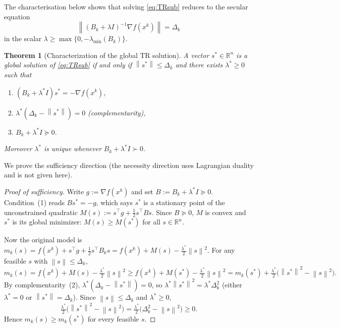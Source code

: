 \documentclass[11pt,a4paper]{report}
\theoremstyle{plain}
\newtheorem{theorem}{Theorem}[chapter]
\theoremstyle{definition}
\newcommand{\R}{\mathbb{R}}
\newcommand{\norm}[1]{\left\lVert#1\right\rVert}
\newcommand{\grad}{\nabla}
\newcommand{\trans}{^{\top}}
\begin{document}
The characterisation below shows that solving \eqref{eq:TRsub} reduces to the secular equation 
\[
  \norm{(B_{k}+\lambda I)^{-1}\grad f(x^{k})}=\Delta_{k}
\]
in the scalar $\lambda\ge\max\{0,-\lambda_{\min}(B_{k})\}$.

\begin{theorem}[Characterization of the global TR solution]\label{thm:TR-charac}
A vector $s^{*}\in\R^{n}$ is a global solution of \eqref{eq:TRsub} if and only if
$\norm{s^{*}}\le\Delta_{k}$ and there exists $\lambda^{*}\ge 0$ such that
\begin{enumerate}[leftmargin=2em,itemsep=0pt]
  \item $(B_{k}+\lambda^{*}I)s^{*}=-\grad f(x^{k})$,
  \item $\lambda^{*}(\Delta_{k}-\norm{s^{*}})=0$ \quad(complementarity),
  \item $B_{k}+\lambda^{*}I\succeq 0$.
\end{enumerate}
Moreover $\lambda^{*}$ is unique whenever $B_{k}+\lambda^{*}I\succ 0$.
\end{theorem}

We prove the sufficiency direction (the necessity direction uses Lagrangian duality and is not given here).

\begin{proof}[Proof of sufficiency]
Write $g:=\grad f(x^{k})$ and set $B:=B_{k}+\lambda^{*}I\succeq 0$.
Condition~(1) reads $Bs^{*}=-g$, which says $s^{*}$ is a stationary point of the
unconstrained quadratic $M(s):=s\trans g+\tfrac12 s\trans Bs$.
Since $B\succeq 0$, $M$ is convex and $s^{*}$ is its global minimizer:
$M(s)\ge M(s^{*})$ for all $s\in\R^{n}$.

Now the original model is $m_{k}(s)=f(x^{k})+s\trans g+\tfrac12 s\trans B_{k}s
=f(x^{k})+M(s)-\tfrac{\lambda^{*}}{2}\norm{s}^{2}$.
For any feasible $s$ with $\norm{s}\le\Delta_{k}$,
\[
m_{k}(s)=f(x^{k})+M(s)-\tfrac{\lambda^{*}}{2}\norm{s}^{2}
\ge f(x^{k})+M(s^{*})-\tfrac{\lambda^{*}}{2}\norm{s}^{2}
=m_{k}(s^{*})+\tfrac{\lambda^{*}}{2}\bigl(\norm{s^{*}}^{2}-\norm{s}^{2}\bigr).
\]
By complementarity~(2), $\lambda^{*}(\Delta_{k}-\norm{s^{*}})=0$, so
$\lambda^{*}\norm{s^{*}}^{2}=\lambda^{*}\Delta_{k}^{2}$ (either $\lambda^{*}=0$ or
$\norm{s^{*}}=\Delta_{k}$). Since $\norm{s}\le\Delta_{k}$ and $\lambda^{*}\ge 0$,
\[
\tfrac{\lambda^{*}}{2}\bigl(\norm{s^{*}}^{2}-\norm{s}^{2}\bigr)
=\tfrac{\lambda^{*}}{2}\bigl(\Delta_{k}^{2}-\norm{s}^{2}\bigr)\ge 0.
\]
Hence $m_{k}(s)\ge m_{k}(s^{*})$ for every feasible $s$.
\end{proof}
\end{document}
